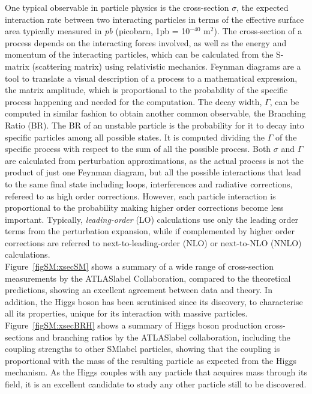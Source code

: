 One typical observable in particle physics is the cross-section $\sigma$, the expected interaction rate between two interacting particles in terms of the effective surface area typically measured in \textit{pb} (picobarn, 1pb = 10$^{-40}$ m$^2$). The cross-section of a process depends on the interacting forces involved, as well as the energy and momentum of the interacting particles, which can be calculated from the S-matrix (scattering matrix) using relativistic mechanics. Feynman diagrams are a tool to translate a visual description of a process to a mathematical expression, the matrix amplitude, which is proportional to the probability of the specific process happening and needed for the computation. The decay width, $\Gamma$, can be computed in similar fashion to obtain another common observable, the Branching Ratio (BR). The BR of an unstable particle is the probability for it to decay into specific particles among all possible states. It is computed dividing the $\Gamma$ of the specific process with respect to the sum of all the possible process. Both $\sigma$ and $\Gamma$ are calculated from perturbation approximations, as the actual process is not the product of just one Feynman diagram, but all the possible interactions that lead to the same final state including loops, interferences and radiative corrections, refereed to as high order corrections. However, each particle interaction is proportional to the probability making higher order corrections become less important. Typically, \textit{leading-order} (LO) calculations use only the leading order terms from the perturbation expansion, while if complemented by higher order corrections are referred to next-to-leading-order (NLO) or next-to-NLO (NNLO) calculations.\\

Figure~\ref{figSM:xsecSM} shows a summary of a wide range of cross-section measurements by the \acrshort{ATLASlabel} Collaboration, compared to the theoretical predictions, showing an excellent agreement between data and theory. In addition, the Higgs boson has been scrutinised since its discovery, to characterise all its properties, unique for its interaction with massive particles. Figure~\ref{figSM:xsecBRH} shows a summary of Higgs boson production cross-sections and branching ratios by the \acrshort{ATLASlabel} collaboration, including the coupling strengths to other \acrshort{SMlabel} particles, showing that the coupling is proportional with the mass of the resulting particle as expected from the Higgs mechanism. As the Higgs couples with any particle that acquires mass through its field, it is an excellent candidate to study any other particle still to be discovered.\\

